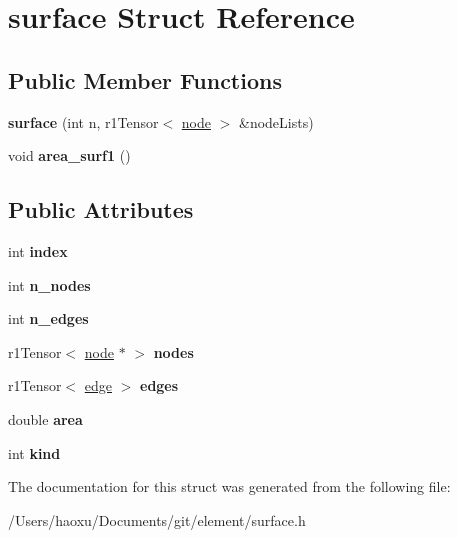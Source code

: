 \hypertarget{structsurface}{}\section{surface Struct Reference}
\label{structsurface}
\subsection*{Public Member Functions}
\begin{DoxyCompactItemize}
\item 
\mbox{\label{structsurface_afc5369f573afffc96aa9c47702467e9a}} 
{\bfseries surface} (int n, r1\+Tensor$<$ \hyperlink{structnode}{node} $>$ \&node\+Lists)
\item 
\mbox{\label{structsurface_ace2837a6697083d412f54f75831f5d4e}} 
void {\bfseries area\+\_\+surf1} ()
\end{DoxyCompactItemize}
\subsection*{Public Attributes}
\begin{DoxyCompactItemize}
\item 
\mbox{\label{structsurface_a2982d55d5c6a8b5e2473987c0613d302}} 
int {\bfseries index}
\item 
\mbox{\label{structsurface_a6e23728322497ca185edbb2ebee2bc0d}} 
int {\bfseries n\+\_\+nodes}
\item 
\mbox{\label{structsurface_af41fd81f0ab34fee9617c23737876f4e}} 
int {\bfseries n\+\_\+edges}
\item 
\mbox{\label{structsurface_a16ab1fdfe574000a606add5ab5f1a924}} 
r1\+Tensor$<$ \hyperlink{structnode}{node} $\ast$ $>$ {\bfseries nodes}
\item 
\mbox{\label{structsurface_aeb700efb2047a0c346e5016d15ef5151}} 
r1\+Tensor$<$ \hyperlink{structedge}{edge} $>$ {\bfseries edges}
\item 
\mbox{\label{structsurface_a2ea0783fd4be9a6ed18cff9008c6e3f0}} 
double {\bfseries area}
\item 
\mbox{\label{structsurface_a16d25b4e0851e4a36c974b1fdb2f63a0}} 
int {\bfseries kind}
\end{DoxyCompactItemize}


The documentation for this struct was generated from the following file\+:\begin{DoxyCompactItemize}
\item 
/\+Users/haoxu/\+Documents/git/element/surface.\+h\end{DoxyCompactItemize}
